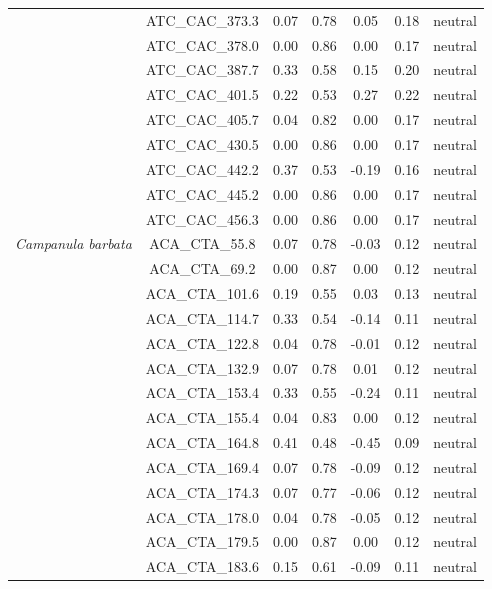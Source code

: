 \documentclass[11pt,]{article}
\begin{document}
\begin{longtable}[c]{@{}lcccccc@{}}
\\\addlinespace
& ATC\_CAC\_373.3 & 0.07 & 0.78 & 0.05 & 0.18 & neutral
\\\addlinespace
& ATC\_CAC\_378.0 & 0.00 & 0.86 & 0.00 & 0.17 & neutral
\\\addlinespace
& ATC\_CAC\_387.7 & 0.33 & 0.58 & 0.15 & 0.20 & neutral
\\\addlinespace
& ATC\_CAC\_401.5 & 0.22 & 0.53 & 0.27 & 0.22 & neutral
\\\addlinespace
& ATC\_CAC\_405.7 & 0.04 & 0.82 & 0.00 & 0.17 & neutral
\\\addlinespace
& ATC\_CAC\_430.5 & 0.00 & 0.86 & 0.00 & 0.17 & neutral
\\\addlinespace
& ATC\_CAC\_442.2 & 0.37 & 0.53 & -0.19 & 0.16 & neutral
\\\addlinespace
& ATC\_CAC\_445.2 & 0.00 & 0.86 & 0.00 & 0.17 & neutral
\\\addlinespace
& ATC\_CAC\_456.3 & 0.00 & 0.86 & 0.00 & 0.17 & neutral
\\\addlinespace
\textit{Campanula barbata} & ACA\_CTA\_55.8 & 0.07 & 0.78 & -0.03 & 0.12
& neutral
\\\addlinespace
& ACA\_CTA\_69.2 & 0.00 & 0.87 & 0.00 & 0.12 & neutral
\\\addlinespace
& ACA\_CTA\_101.6 & 0.19 & 0.55 & 0.03 & 0.13 & neutral
\\\addlinespace
& ACA\_CTA\_114.7 & 0.33 & 0.54 & -0.14 & 0.11 & neutral
\\\addlinespace
& ACA\_CTA\_122.8 & 0.04 & 0.78 & -0.01 & 0.12 & neutral
\\\addlinespace
& ACA\_CTA\_132.9 & 0.07 & 0.78 & 0.01 & 0.12 & neutral
\\\addlinespace
& ACA\_CTA\_153.4 & 0.33 & 0.55 & -0.24 & 0.11 & neutral
\\\addlinespace
& ACA\_CTA\_155.4 & 0.04 & 0.83 & 0.00 & 0.12 & neutral
\\\addlinespace
& ACA\_CTA\_164.8 & 0.41 & 0.48 & -0.45 & 0.09 & neutral
\\\addlinespace
& ACA\_CTA\_169.4 & 0.07 & 0.78 & -0.09 & 0.12 & neutral
\\\addlinespace
& ACA\_CTA\_174.3 & 0.07 & 0.77 & -0.06 & 0.12 & neutral
\\\addlinespace
& ACA\_CTA\_178.0 & 0.04 & 0.78 & -0.05 & 0.12 & neutral
\\\addlinespace
& ACA\_CTA\_179.5 & 0.00 & 0.87 & 0.00 & 0.12 & neutral
\\\addlinespace
& ACA\_CTA\_183.6 & 0.15 & 0.61 & -0.09 & 0.11 & neutral

\end{longtable}
\end{document}
